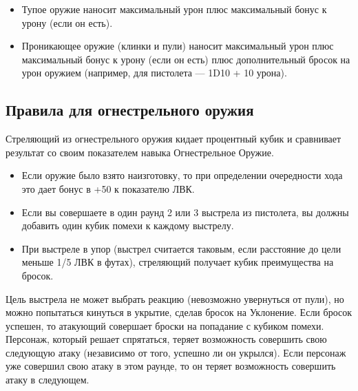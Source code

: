 \documentclass[letterpaper,twocolumn,openany, twoside, 11pt, usenames]{cocbook}
\begin{document}
\begin{itemize}[leftmargin=4mm]
  \item Тупое оружие наносит максимальный урон плюс максимальный бонус к урону (если он есть).
  \item Проникающее оружие (клинки и пули) наносит максимальный урон плюс максимальный бонус к урону (если он есть) плюс дополнительный бросок на урон оружием (например, для пистолета --- 1D10 + 10 урона).
\end{itemize}

\smallbreak
\noindent {}
\smallbreak

\subsection*{Правила для огнестрельного оружия}

Стреляющий из огнестрельного оружия кидает процентный кубик и сравнивает результат со своим показателем навыка Огнестрельное Оружие.

\begin{itemize}[leftmargin=4mm]
  \item Если оружие было взято наизготовку, то при определении очередности хода это дает бонус в +50 к показателю ЛВК.
  \item Если вы совершаете в один раунд 2 или 3 выстрела из пистолета, вы должны добавить один кубик помехи к каждому выстрелу.
  \item При выстреле в упор (выстрел считается таковым, если расстояние до цели меньше 1/5 ЛВК в футах), стреляющий получает кубик преимущества на бросок.
\end{itemize}

Цель выстрела не может выбрать реакцию (невозможно увернуться от пули), но можно попытаться кинуться в укрытие, сделав бросок на Уклонение. Если бросок успешен, то атакующий совершает броски на попадание с кубиком помехи. Персонаж, который решает спрятаться, теряет возможность совершить свою следующую атаку (независимо от того, успешно ли он укрылся). Если персонаж уже совершил свою атаку в этом раунде, то он теряет возможность совершить атаку в следующем.

\smallbreak
\noindent {}
\end{document}
